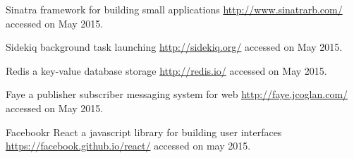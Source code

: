\begin{thebibliography}{99999}
 Sinatra framework for building small applications \url{http://www.sinatrarb.com/} accessed on May 2015.

 Sidekiq background task launching \url{http://sidekiq.org/} accessed on May 2015.

 Redis a key-value database storage \url{http://redis.io/} accessed on May 2015.

 Faye a publisher subscriber messaging system for web \url{http://faye.jcoglan.com/} accessed on May 2015.

 Facebookr React a javascript library for building user interfaces \url{https://facebook.github.io/react/} accessed on may 2015.

\end{thebibliography}
